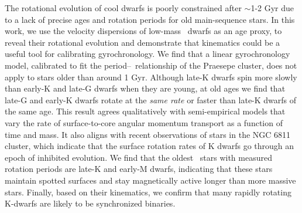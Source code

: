 The rotational evolution of cool dwarfs is poorly constrained after $\sim$1-2
Gyr due to a lack of precise ages and rotation periods for old main-sequence
stars.
In this work, we use the velocity dispersions of low-mass \kepler\ dwarfs as
an age proxy, to reveal their rotational evolution and demonstrate that
kinematics could be a useful tool for calibrating gyrochronology.
We find that a linear gyrochronology model, calibrated to fit the
period--\teff\ relationship of the Praesepe cluster, does not apply to stars
older than around 1 Gyr.
Although late-K dwarfs spin more slowly than early-K and late-G dwarfs when
they are young, at old ages we find that late-G and early-K dwarfs rotate at
the {\it same rate} or faster than late-K dwarfs of the same age.
This result agrees qualitatively with semi-empirical models that vary the rate
of surface-to-core angular momentum transport as a function of time and mass.
It also aligns with recent observations of stars in the NGC 6811 cluster,
which indicate that the surface rotation rates of K dwarfs go through an epoch
of inhibited evolution.
We find that the oldest \kepler\ stars with measured rotation periods are
late-K and early-M dwarfs, indicating that these stars maintain spotted
surfaces and stay magnetically active longer than more massive stars.
Finally, based on their kinematics, we confirm that many rapidly rotating
K-dwarfs are likely to be synchronized binaries.
